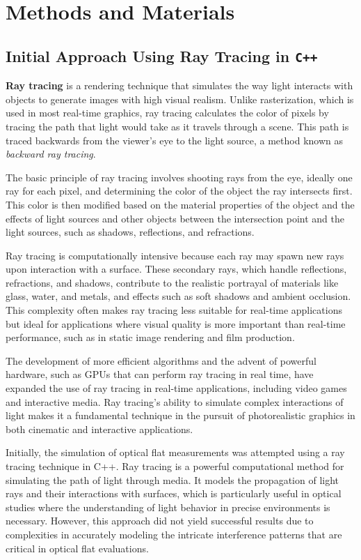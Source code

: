 \documentclass[../main.tex]{subfiles}
\begin{document}
\chapter{Methods and Materials}

\section{Initial Approach Using Ray Tracing in \texttt{C++}}
\textbf{Ray tracing} is a rendering technique that simulates the way light interacts with objects to generate images with high visual realism. Unlike rasterization, which is used in most real-time graphics, ray tracing calculates the color of pixels by tracing the path that light would take as it travels through a scene. This path is traced backwards from the viewer's eye to the light source, a method known as \textit{backward ray tracing}.

The basic principle of ray tracing involves shooting rays from the eye, ideally one ray for each pixel, and determining the color of the object the ray intersects first. This color is then modified based on the material properties of the object and the effects of light sources and other objects between the intersection point and the light sources, such as shadows, reflections, and refractions.

Ray tracing is computationally intensive because each ray may spawn new rays upon interaction with a surface. These secondary rays, which handle reflections, refractions, and shadows, contribute to the realistic portrayal of materials like glass, water, and metals, and effects such as soft shadows and ambient occlusion. This complexity often makes ray tracing less suitable for real-time applications but ideal for applications where visual quality is more important than real-time performance, such as in static image rendering and film production.

The development of more efficient algorithms and the advent of powerful hardware, such as GPUs that can perform ray tracing in real time, have expanded the use of ray tracing in real-time applications, including video games and interactive media. Ray tracing's ability to simulate complex interactions of light makes it a fundamental technique in the pursuit of photorealistic graphics in both cinematic and interactive applications.

Initially, the simulation of optical flat measurements was attempted using a ray tracing technique in C++. Ray tracing is a powerful computational method for simulating the path of light through media. It models the propagation of light rays and their interactions with surfaces, which is particularly useful in optical studies where the understanding of light behavior in precise environments is necessary. However, this approach did not yield successful results due to complexities in accurately modeling the intricate interference patterns that are critical in optical flat evaluations.
\end{document}

